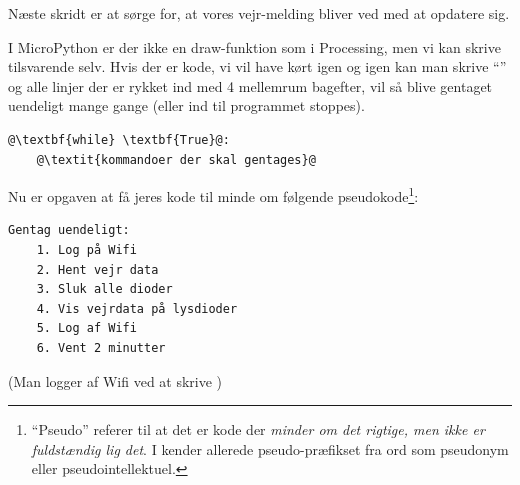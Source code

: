 \documentclass{ucph-handout}
\newcounter{handout}
\newcommand{\Ark}{Arbejdsark \arabic{handout}: }
\renewcommand{\Title}{\Ark LED-strip}%
\begin{document}
\begin{exercisebox}[adjusted title=Gentag uendeligt]
Næste skridt er at sørge for, at vores vejr-melding bliver ved
med at opdatere sig.

I MicroPython er der ikke en draw-funktion som i Processing, men vi
kan skrive tilsvarende selv. Hvis der er kode, vi vil have kørt igen
og igen kan man skrive ``'' og alle linjer der er
rykket ind med 4 mellemrum bagefter, vil så blive gentaget uendeligt
mange gange (eller ind til programmet stoppes).

\begin{lstlisting}[escapechar=@]
@\textbf{while} \textbf{True}@:
    @\textit{kommandoer der skal gentages}@
\end{lstlisting}

\noindent
Nu er opgaven at få jeres kode til minde om følgende
pseudokode\footnote{``Pseudo'' referer til at det er kode der
  \textit{minder om det rigtige, men ikke er fuldstændig lig det}. I kender allerede
  pseudo-præfikset fra ord som pseudonym eller pseudointellektuel.}:
\begin{lstlisting}[escapechar=@]
Gentag uendeligt:
    1. Log på Wifi
    2. Hent vejr data
    3. Sluk alle dioder
    4. Vis vejrdata på lysdioder
    5. Log af Wifi
    6. Vent 2 minutter
\end{lstlisting}

\noindent
(Man logger af Wifi ved at skrive )
\end{exercisebox}
\newpage
{}
\renewcommand{\Title}{\Ark Løkker}
\end{document}
